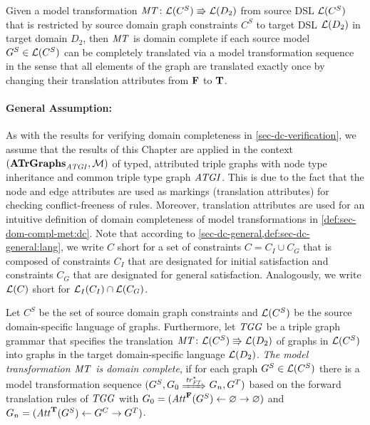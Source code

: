 Given a model transformation $\mathit{MT}\colon \mathcal{L}(C^S) \Rrightarrow \mathcal{L}(D_2)$ from source DSL $\mathcal{L}(C^S)$ that is restricted by source domain graph constraints $C^S$ to target DSL $\mathcal{L}(D_2)$ in target domain $D_2$, then $\mathit{MT}$ is domain complete if each source model $G^S \in \mathcal{L}(C^S)$ can be completely translated via a model transformation sequence in the sense that all elements of the graph are translated exactly once by changing their translation attributes from $\mathbf{F}$ to $\mathbf{T}$.

\paragraph*{General Assumption:}
As with the results for verifying domain completeness in \cref{sec-dc-verification}, we assume that the results of this Chapter are applied in the context $(\mathbf{ATrGraphs}_\mathit{ATGI},{\cal M})$ of typed, attributed triple graphs with node type inheritance and common triple type graph $\mathit{ATGI}$.
This is due to the fact that the node and edge attributes are used as markings (translation attributes) for checking conflict-freeness of rules.
Moreover, translation attributes are used for an intuitive definition of domain completeness of model transformations in \cref{def:sec-dom-compl-met:dc}.
Note that according to \cref{sec-dc-general,def:sec-dc-general:lang}, we write $C$ short for a set of constraints $C=C_I \cup C_G$ that is composed of constraints $C_I$ that are designated for initial satisfaction and constraints $C_G$ that are designated for general satisfaction.
Analogously, we write $\mathcal{L}(C)$ short for $\mathcal{L}_I(C_I) \cap \mathcal{L}(C_G)$.

\begin{definition}
\label{def:sec-dom-compl-met:dc}
Let $C^S$ be the set of source domain graph constraints and $\mathcal{L}(C^S)$ be the source domain-specific language of graphs. 
Furthermore, let $\mathit{TGG}$ be a triple graph grammar that specifies the translation $\mathit{MT}\colon \mathcal{L}(C^S) \Rrightarrow \mathcal{L}(D_2)$ of graphs in $\mathcal{L}(C^S)$ into graphs in the target domain-specific language $\mathcal{L}(D_2)$.
\emph{The model transformation $\mathit{MT}$ is domain complete}, if for each graph $G^S \in \mathcal{L}(C^S)$ there is a model transformation sequence $(G^S,G_0 \Trans{\tr^*_\FT} G_n,G^T)$ based on the forward translation rules of $\mathit{TGG}$ with $G_0=(\mathit{Att}^\mathbf{F}(G^S) \gets \varnothing \to \varnothing)$ and $G_n=(\mathit{Att}^\mathbf{T}(G^S) \gets G^C \to G^T)$.
\envEndMarker
\end{definition}

